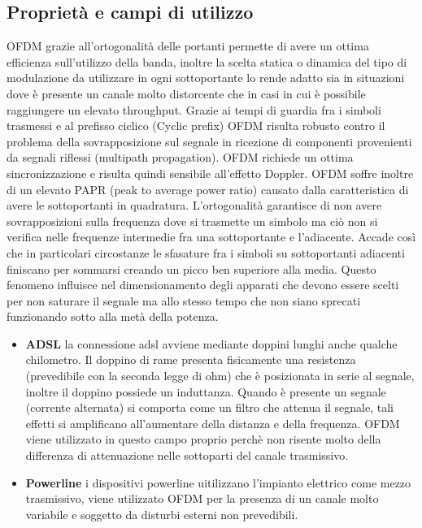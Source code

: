 \begin{itemize}
\section{Proprietà e campi di utilizzo}
OFDM grazie all'ortogonalità delle portanti permette di avere un ottima efficienza sull'utilizzo della banda, inoltre la scelta statica o dinamica del tipo di modulazione da utilizzare in ogni sottoportante lo rende adatto sia in situazioni dove è presente un canale molto distorcente che in casi in cui è possibile raggiungere un elevato throughput. Grazie ai tempi di guardia fra i simboli trasmessi e al prefisso ciclico (Cyclic prefix) OFDM risulta robusto contro il problema della sovrapposizione sul segnale in ricezione di componenti provenienti da segnali riflessi (multipath propagation). OFDM richiede un ottima sincronizzazione e risulta quindi sensibile all'effetto Doppler. OFDM soffre inoltre di un elevato PAPR (peak to average power ratio) causato dalla caratteristica di avere le sottoportanti in quadratura. L'ortogonalità garantisce di non avere sovrapposizioni sulla frequenza dove si trasmette un simbolo ma ciò non si verifica nelle frequenze intermedie fra una sottoportante e l'adiacente. Accade così che in particolari circostanze le sfasature fra i simboli su sottoportanti adiacenti finiscano per sommarsi creando un picco ben superiore alla media. Questo fenomeno influisce nel dimensionamento degli apparati che devono essere scelti per non saturare il segnale ma allo stesso tempo che non siano sprecati funzionando sotto alla metà della potenza.
\cite{papr}
\begin{itemize}
	\item \textbf{ADSL} la connessione adsl avviene mediante doppini lunghi anche qualche chilometro. Il doppino di rame presenta fisicamente una resistenza (prevedibile con la seconda legge di ohm) che è posizionata in serie al segnale, inoltre il doppino possiede un induttanza. Quando è presente un segnale (corrente alternata) si comporta come un filtro che attenua il segnale, tali effetti si amplificano all'aumentare della distanza e della frequenza. OFDM viene utilizzato in questo campo proprio perchè non risente molto della differenza di attenuazione nelle sottoparti del canale trasmissivo.
\end{itemize}
\begin{itemize}
	\item \textbf{Powerline} i dispositivi powerline uitilizzano l'impianto elettrico come mezzo trasmissivo, viene utilizzato OFDM per la presenza di un canale molto variabile e soggetto da disturbi esterni non prevedibili.

\end{itemize}
\end{itemize}
